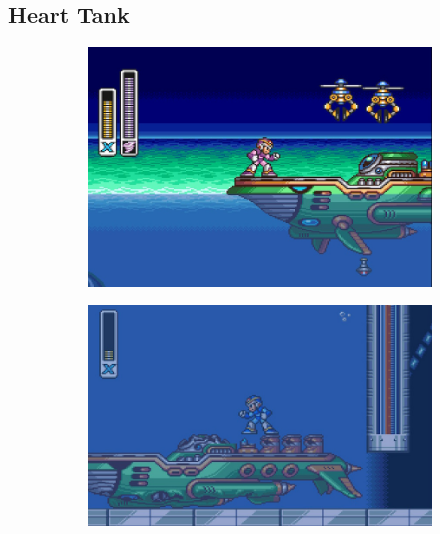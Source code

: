\subsection{Heart Tank}
\begin{figure}[h]
	\centering
	\begin{subfigure}{0.37\textwidth}
		\centering
		\includegraphics[width=\linewidth]{figures/X1/Launch_octopus/Octopus_heart_1.jpg}
		\caption{}
	\end{subfigure}
	\begin{subfigure}{0.4\textwidth}
		\centering
		\includegraphics[width=\linewidth]{figures/X1/Launch_octopus/Octopus_heart_2.jpg}
		\caption{}
	\end{subfigure}\\
	\begin{subfigure}{0.4\textwidth}
		\centering

\end{subfigure}
\end{figure}
